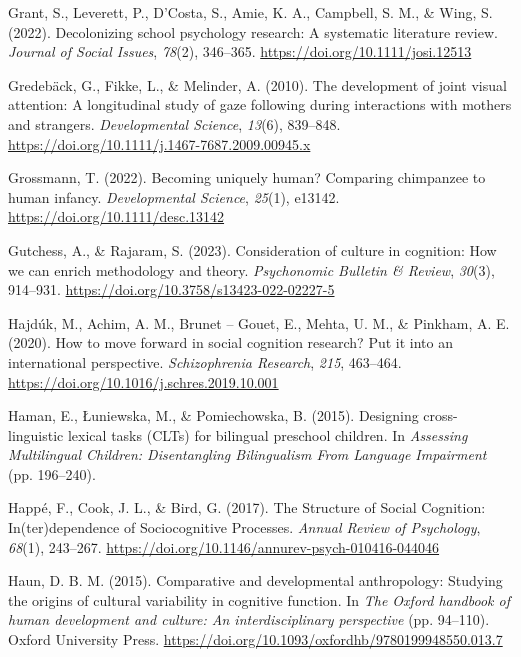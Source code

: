 \documentclass[
]{scrbook}
\newlength{\cslhangindent}
\newenvironment{CSLReferences}[2] %
 {\begin{list}{}{%
  \setlength{\itemindent}{0pt}
  \setlength{\leftmargin}{0pt}
  \setlength{\parsep}{0pt}
  \ifodd #1
   \setlength{\leftmargin}{\cslhangindent}
   \setlength{\itemindent}{-1\cslhangindent}
  \fi
  \setlength{\itemsep}{#2\baselineskip}}}
 {\end{list}}
\begin{document}
\begin{CSLReferences}{1}{0}
Grant, S., Leverett, P., D'Costa, S., Amie, K. A., Campbell, S. M., \& Wing, S. (2022). Decolonizing school psychology research: {A} systematic literature review. \emph{Journal of Social Issues}, \emph{78}(2), 346--365. \url{https://doi.org/10.1111/josi.12513}

Gredebäck, G., Fikke, L., \& Melinder, A. (2010). The development of joint visual attention: A longitudinal study of gaze following during interactions with mothers and strangers. \emph{Developmental Science}, \emph{13}(6), 839--848. \url{https://doi.org/10.1111/j.1467-7687.2009.00945.x}

Grossmann, T. (2022). Becoming uniquely human? {Comparing} chimpanzee to human infancy. \emph{Developmental Science}, \emph{25}(1), e13142. \url{https://doi.org/10.1111/desc.13142}

Gutchess, A., \& Rajaram, S. (2023). Consideration of culture in cognition: {How} we can enrich methodology and theory. \emph{Psychonomic Bulletin \& Review}, \emph{30}(3), 914--931. \url{https://doi.org/10.3758/s13423-022-02227-5}

Hajdúk, M., Achim, A. M., Brunet -- Gouet, E., Mehta, U. M., \& Pinkham, A. E. (2020). How to move forward in social cognition research? {Put} it into an international perspective. \emph{Schizophrenia Research}, \emph{215}, 463--464. \url{https://doi.org/10.1016/j.schres.2019.10.001}

Haman, E., Łuniewska, M., \& Pomiechowska, B. (2015). Designing cross-linguistic lexical tasks ({CLTs}) for bilingual preschool children. In \emph{Assessing {Multilingual Children}: {Disentangling Bilingualism From Language Impairment}} (pp. 196--240).

Happé, F., Cook, J. L., \& Bird, G. (2017). The {Structure} of {Social Cognition}: {In}(ter)dependence of {Sociocognitive Processes}. \emph{Annual Review of Psychology}, \emph{68}(1), 243--267. \url{https://doi.org/10.1146/annurev-psych-010416-044046}

Haun, D. B. M. (2015). Comparative and developmental anthropology: {Studying} the origins of cultural variability in cognitive function. In \emph{The {Oxford} handbook of human development and culture: {An} interdisciplinary perspective} (pp. 94--110). Oxford University Press. \url{https://doi.org/10.1093/oxfordhb/9780199948550.013.7}


\end{CSLReferences}
\end{document}
